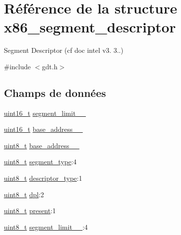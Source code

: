 \hypertarget{structx86__segment__descriptor}{\section{Référence de la structure x86\+\_\+segment\+\_\+descriptor}
\label{structx86__segment__descriptor}
}


Segment Descriptor (cf doc intel v3. 3..)  




{\ttfamily \#include $<$gdt.\+h$>$}

\subsection*{Champs de données}
\begin{DoxyCompactItemize}
\item 
\hyperlink{kernel_2include_2types_8h_adf4d876453337156dde61095e1f20223}{uint16\+\_\+t} \hyperlink{structx86__segment__descriptor_af9516f6d07c24ddedde31235b05b62c2}{segment\+\_\+limit\+\_\+\_}
\item 
\hyperlink{kernel_2include_2types_8h_adf4d876453337156dde61095e1f20223}{uint16\+\_\+t} \hyperlink{structx86__segment__descriptor_a6cd0f49e21060fadba677c3b41685ebf}{base\+\_\+address\+\_\+\_}
\item 
\hyperlink{kernel_2include_2types_8h_aba7bc1797add20fe3efdf37ced1182c5}{uint8\+\_\+t} \hyperlink{structx86__segment__descriptor_a95889fcbabf116ba15a6cea3364b903d}{base\+\_\+address\+\_\+\_}
\item 
\hyperlink{kernel_2include_2types_8h_aba7bc1797add20fe3efdf37ced1182c5}{uint8\+\_\+t} \hyperlink{structx86__segment__descriptor_ab3ef0c9fce1e74ee6549bbce5ea6f25f}{segment\+\_\+type}\+:4
\item 
\hyperlink{kernel_2include_2types_8h_aba7bc1797add20fe3efdf37ced1182c5}{uint8\+\_\+t} \hyperlink{structx86__segment__descriptor_adda0434239b7e6c6a68b8e7556e4bb2f}{descriptor\+\_\+type}\+:1
\item 
\hyperlink{kernel_2include_2types_8h_aba7bc1797add20fe3efdf37ced1182c5}{uint8\+\_\+t} \hyperlink{structx86__segment__descriptor_ab45e49c27bbe57a568d914bd13e45ef7}{dpl}\+:2
\item 
\hyperlink{kernel_2include_2types_8h_aba7bc1797add20fe3efdf37ced1182c5}{uint8\+\_\+t} \hyperlink{structx86__segment__descriptor_ad4196191d05e69b42272a411a69d1eae}{present}\+:1
\item 
\hyperlink{kernel_2include_2types_8h_aba7bc1797add20fe3efdf37ced1182c5}{uint8\+\_\+t} \hyperlink{structx86__segment__descriptor_a6ab37b8f7730fe67af946725a3dd064a}{segment\+\_\+limit\+\_\+\_}\+:4

\end{DoxyCompactItemize}
